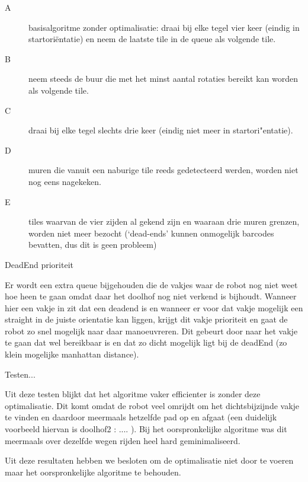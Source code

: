 \documentclass[tt2]{penoverslag}
\begin{document}
\begin{description}
\item[A] basisalgoritme zonder optimalisatie: draai bij elke tegel vier keer (eindig in startori\"entatie) en neem de laatste tile in de queue als volgende tile.
\item[B] neem steeds de buur die met het minst aantal rotaties bereikt kan worden als volgende tile.
\item[C] draai bij elke tegel slechts drie keer (eindig niet meer in startori"entatie).
\item[D] muren die vanuit een naburige tile reeds gedetecteerd werden, worden niet nog eens nagekeken.
\item[E] tiles waarvan de vier zijden al gekend zijn en waaraan drie muren grenzen, worden niet meer bezocht (`dead-ends' kunnen onmogelijk barcodes bevatten, dus dit is geen probleem)
\end{description}

DeadEnd prioriteit

Er wordt een extra queue bijgehouden die de vakjes waar de robot nog niet weet hoe heen te gaan
omdat daar het doolhof nog niet verkend is bijhoudt. Wanneer hier een vakje in zit dat een deadend
is en wanneer er voor dat vakje mogelijk een straight in de juiste orientatie kan liggen, krijgt dit
vakje prioriteit en gaat de robot zo snel mogelijk naar daar manoeuvreren. Dit gebeurt door naar het
vakje te gaan dat wel bereikbaar is en dat zo dicht mogelijk ligt bij de deadEnd (zo klein mogelijke
manhattan distance).

Testen...

Uit deze testen blijkt dat het algoritme vaker efficienter is zonder deze optimalisatie. Dit komt omdat
de robot veel omrijdt om het dichtsbijzijnde vakje te vinden en daardoor meermaals hetzelfde pad
op en afgaat (een duidelijk voorbeeld hiervan is doolhof2 : .... ). Bij het oorspronkelijke algoritme was
dit meermaals over dezelfde wegen rijden heel hard geminimaliseerd.

Uit deze resultaten hebben we besloten om de optimalisatie niet door te voeren maar het
oorspronkelijke algoritme te behouden.

%
\end{document}
